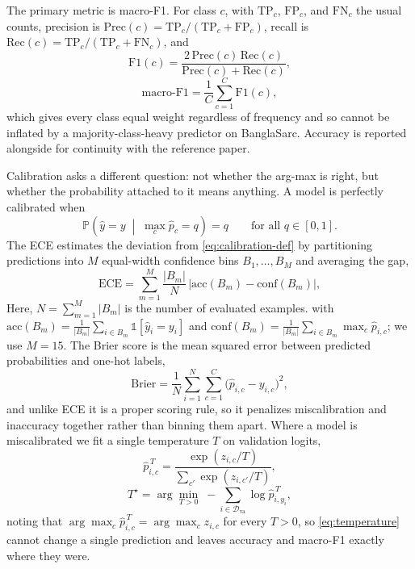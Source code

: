 \documentclass{ieeeaccess}
\newcommand{\dset}[1]{#1}
\begin{document}
The primary metric is macro-F1. For class $c$, with $\mathrm{TP}_c$, $\mathrm{FP}_c$, and $\mathrm{FN}_c$ the usual counts, precision is $\mathrm{Prec}(c)=\mathrm{TP}_c/(\mathrm{TP}_c+\mathrm{FP}_c)$, recall is $\mathrm{Rec}(c)=\mathrm{TP}_c/(\mathrm{TP}_c+\mathrm{FN}_c)$, and
\begin{equation}
\mathrm{F1}(c) = \frac{2\,\mathrm{Prec}(c)\,\mathrm{Rec}(c)}{\mathrm{Prec}(c)+\mathrm{Rec}(c)},
\label{eq:f1}
\end{equation}
\begin{equation}
\mathrm{macro\text{-}F1}=\frac{1}{C}\sum_{c=1}^{C}\mathrm{F1}(c),
\label{eq:macrof1}
\end{equation}
which gives every class equal weight regardless of frequency and so cannot be inflated by a majority-class-heavy predictor on \dset{BanglaSarc}. Accuracy is reported alongside for continuity with the reference paper.

Calibration asks a different question: not whether the arg-max is right, but whether the probability attached to it means anything. A model is perfectly calibrated when
\begin{equation}
\mathbb{P}\!\left(\hat{y}=y \;\middle|\; \max_c \hat{p}_c = q\right) = q \qquad \text{for all } q\in[0,1].
\label{eq:calibration-def}
\end{equation}
The ECE \cite{guo2017calibration,naeini2015ece} estimates the deviation from \cref{eq:calibration-def} by partitioning predictions into $M$ equal-width confidence bins $B_1,\ldots,B_M$ and averaging the gap,
\begin{equation}
\mathrm{ECE} = \sum_{m=1}^{M}\frac{|B_m|}{N}\,\bigl|\mathrm{acc}(B_m) - \mathrm{conf}(B_m)\bigr|,
\label{eq:ece}
\end{equation}
Here, \(N=\sum_{m=1}^{M}|B_m|\) is the number of evaluated examples.
with $\mathrm{acc}(B_m) = \tfrac{1}{|B_m|}\sum_{i\in B_m}\mathbb{1}[\hat{y}_i=y_i]$ and $\mathrm{conf}(B_m) = \tfrac{1}{|B_m|}\sum_{i\in B_m}\max_c\hat{p}_{i,c}$; we use $M\!=\!15$. The Brier score \cite{brier1950verification} is the mean squared error between predicted probabilities and one-hot labels,
\begin{equation}
\mathrm{Brier} = \frac{1}{N}\sum_{i=1}^{N}\sum_{c=1}^{C}\bigl(\hat{p}_{i,c}-y_{i,c}\bigr)^{2},
\label{eq:brier}
\end{equation}
and unlike ECE it is a proper scoring rule, so it penalizes miscalibration and inaccuracy together rather than binning them apart. Where a model is miscalibrated we fit a single temperature $T$ on validation logits,
\begin{equation}
\hat{p}^{\,T}_{i,c} = \frac{\exp(z_{i,c}/T)}{\sum_{c'}\exp(z_{i,c'}/T)},
\label{eq:tempsoftmax}
\end{equation}
\begin{equation}
T^{\star} = \arg\min_{T>0}\; -\!\!\sum_{i\in\mathcal{D}_{\mathrm{va}}}\!\log \hat{p}^{\,T}_{i,y_i},
\label{eq:temperature}
\end{equation}
noting that $\arg\max_c \hat{p}^{\,T}_{i,c} = \arg\max_c z_{i,c}$ for every $T>0$, so \cref{eq:temperature} cannot change a single prediction and leaves accuracy and macro-F1 exactly where they were.
\end{document}

